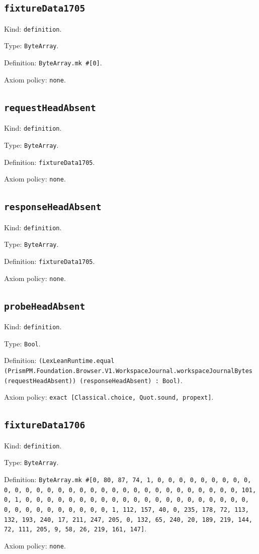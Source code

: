 \documentclass[11pt]{article}
\begin{document}
\subsection*{\texttt{fixtureData1705}}
\noindent Kind: \texttt{definition}.\par
\noindent Type: \texttt{ByteArray}.\par
\noindent Definition: \texttt{ByteArray.mk \#[0]}.\par
\noindent Axiom policy: \texttt{none}.\par
\subsection*{\texttt{requestHeadAbsent}}
\noindent Kind: \texttt{definition}.\par
\noindent Type: \texttt{ByteArray}.\par
\noindent Definition: \texttt{fixtureData1705}.\par
\noindent Axiom policy: \texttt{none}.\par
\subsection*{\texttt{responseHeadAbsent}}
\noindent Kind: \texttt{definition}.\par
\noindent Type: \texttt{ByteArray}.\par
\noindent Definition: \texttt{fixtureData1705}.\par
\noindent Axiom policy: \texttt{none}.\par
\subsection*{\texttt{probeHeadAbsent}}
\noindent Kind: \texttt{definition}.\par
\noindent Type: \texttt{Bool}.\par
\noindent Definition: \texttt{(LexLeanRuntime.equal (PrismPM.Foundation.Browser.V1.WorkspaceJournal.workspaceJournalBytes (requestHeadAbsent)) (responseHeadAbsent) : Bool)}.\par
\noindent Axiom policy: \texttt{exact [Classical.choice, Quot.sound, propext]}.\par
\subsection*{\texttt{fixtureData1706}}
\noindent Kind: \texttt{definition}.\par
\noindent Type: \texttt{ByteArray}.\par
\noindent Definition: \texttt{ByteArray.mk \#[0, 80, 87, 74, 1, 0, 0, 0, 0, 0, 0, 0, 0, 0, 0, 0, 0, 0, 0, 0, 0, 0, 0, 0, 0, 0, 0, 0, 0, 0, 0, 0, 0, 0, 0, 0, 101, 0, 1, 0, 0, 0, 0, 0, 0, 0, 0, 0, 0, 0, 0, 0, 0, 0, 0, 0, 0, 0, 0, 0, 0, 0, 0, 0, 0, 0, 0, 0, 0, 0, 1, 112, 157, 40, 0, 235, 178, 72, 113, 132, 193, 240, 17, 211, 247, 205, 0, 132, 65, 240, 20, 189, 219, 144, 72, 111, 205, 9, 58, 26, 219, 161, 147]}.\par
\noindent Axiom policy: \texttt{none}.\par
\end{document}
